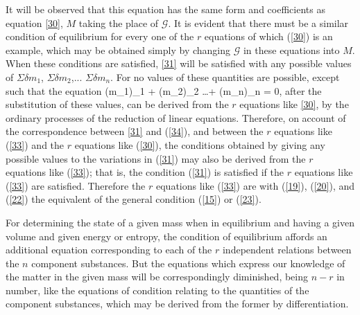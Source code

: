 \documentclass[12pt]{article}
\begin{document}
It will be observed that this equation has the same form and coefficients as equation \ref{30}, $M$ taking the place of $\mathcal{G}$. It is evident that there must be a similar condition of equilibrium for every one of the $r$ equations of which (\ref{30}) is an example, which may be obtained simply by changing $\mathcal{G}$ in these equations into $M$. When these conditions are satisfied, \ref{31} will be satisfied with any possible values of $\Sigma \delta m_1$, $\Sigma \delta m_2$,... $\Sigma \delta m_n$. For no values of these quantities are possible, except such that the equation
\eqs (\Sigma \delta m_1)_1 + (\Sigma \delta m_2)_2 \dots + (\Sigma \delta m_n)_n = 0,     \label{34} \eqe
after the substitution of these values, can be derived from the $r$ equations like \ref{30}, by the ordinary processes of the reduction of linear equations. Therefore, on account of the correspondence between \ref{31} and (\ref{34}), and between the $r$ equations like (\ref{33}) and the $r$ equations like (\ref{30}), the conditions obtained by giving any possible values to the variations in (\ref{31}) may also be derived from the $r$ equations like (\ref{33}); that is, the condition (\ref{31}) is satisfied if the $r$ equations like (\ref{33}) are satisfied. Therefore the $r$ equations like (\ref{33}) are with (\ref{19}), (\ref{20}), and (\ref{22}) the equivalent of the general condition (\ref{15}) or (\ref{23}).

For determining the state of a given mass when in equilibrium and having a given volume and given energy or entropy, the condition of equilibrium affords an additional equation corresponding to each of the $r$ independent relations between the $n$ component substances. But the equations which express our knowledge of the matter in the given mass will be correspondingly diminished, being $n-r$ in number, like the equations of condition relating to the quantities of the component substances, which may be derived from the former by differentiation.
\end{document}
